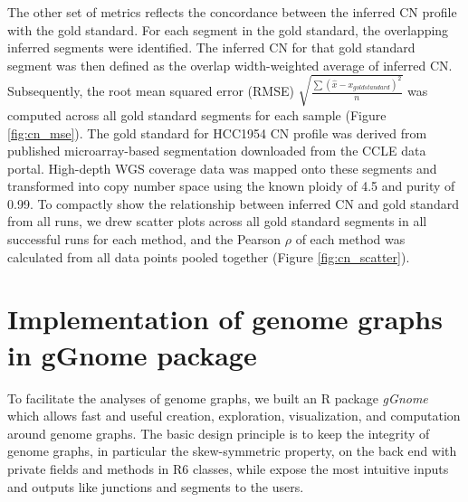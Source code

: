 \documentclass[phd,tocprelim]{cornell}
\begin{document}

The other set of metrics reflects the concordance between the inferred CN profile with the gold standard. For each segment in the gold standard, the overlapping inferred segments were identified. The inferred CN for that gold standard segment was then defined as the overlap width-weighted average of inferred CN. Subsequently, the root mean squared error (RMSE) $\sqrt{\frac{\sum{(\hat{x} - x_{goldstandard})^2}}{n}}$ was computed across all gold standard segments for each sample (Figure \ref{fig:cn_mse}). The gold standard for HCC1954 CN profile was derived from published microarray-based segmentation downloaded from the CCLE data portal. High-depth WGS coverage data was mapped onto these segments and transformed into copy number space using the known ploidy of 4.5 and purity of 0.99. To compactly show the relationship between inferred CN and gold standard from all runs, we drew scatter plots across all gold standard segments in all successful runs for each method, and the Pearson $\rho$ of each method was calculated from all data points pooled together (Figure \ref{fig:cn_scatter}).

\section{Implementation of genome graphs in gGnome package} \label{sec:implement_ggnome}
To facilitate the analyses of genome graphs, we built an R package \textit{gGnome} which allows fast and useful creation, exploration, visualization, and computation around genome graphs. The basic design principle is to keep the integrity of genome graphs, in particular the skew-symmetric property, on the back end with private fields and methods in R6 classes, while expose the most intuitive inputs and outputs like junctions and segments to the users.
\end{document}
